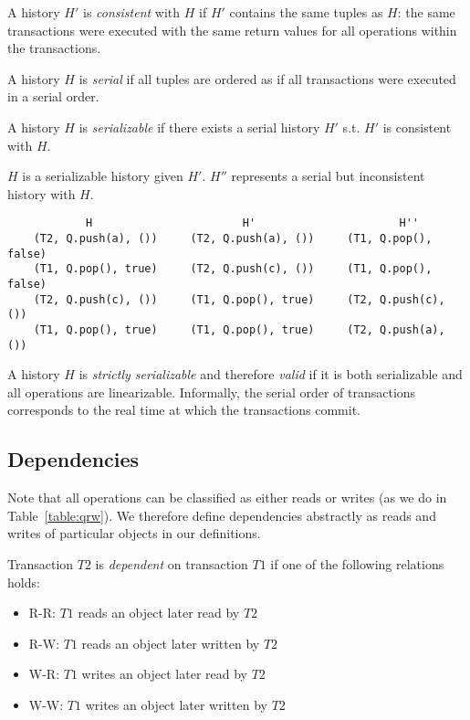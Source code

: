 \begin{defn}
    A history $H'$ is \emph{consistent} with $H$ if $H'$ contains the same tuples as $H$: the same transactions were executed with the same return values for all operations within the transactions.
\end{defn}

\begin{defn}
    A history $H$ is \emph{serial} if all tuples are ordered as if all transactions were executed in a serial order.
\end{defn}
\begin{defn}
    A history $H$ is \emph{serializable} if there exists a serial history $H'$ s.t. $H'$ is consistent with $H$.

\end{defn}

\begin{eg}
$H$ is a serializable history given $H'$. $H''$ represents a serial but inconsistent history with $H$.
\begin{lstlisting}
            H                       H'                      H'' 
    (T2, Q.push(a), ())     (T2, Q.push(a), ())     (T1, Q.pop(), false)
    (T1, Q.pop(), true)     (T2, Q.push(c), ())     (T1, Q.pop(), false)
    (T2, Q.push(c), ())     (T1, Q.pop(), true)     (T2, Q.push(c), ())
    (T1, Q.pop(), true)     (T1, Q.pop(), true)     (T2, Q.push(a), ()) 
\end{lstlisting}
\end{eg}

\begin{defn}
    A history $H$ is \emph{strictly serializable} and therefore \emph{valid} if it is both serializable and all operations are linearizable. Informally, the serial order of transactions corresponds to the real time at which the transactions commit.
\end{defn}

\subsection{Dependencies}

Note that all operations can be classified as either reads or writes (as we do in Table~\ref{table:qrw}). We therefore define dependencies abstractly as reads and writes of particular objects in our definitions.

\begin{defn}
    Transaction $T2$ is \emph{dependent} on transaction $T1$ if one of the following relations holds:
    \begin{itemize}
        \item R-R: $T1$ reads an object later read by $T2$
        \item R-W: $T1$ reads an object later written by $T2$
        \item W-R: $T1$ writes an object later read by $T2$
        \item W-W: $T1$ writes an object later written by $T2$
    \end{itemize}
\end{defn}

